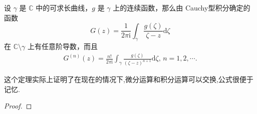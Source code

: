 \documentclass[../../main.tex]{subfiles}%
\begin{document}
\begin{theorem}\label{theorem:定理3.4.2}
设 \( \gamma \) 是 \( \mathbb{C} \) 中的可求长曲线，\( g \) 是 \( \gamma \) 上的连续函数，那么由 Cauchy型积分确定的函数
\[
G(z) = \frac{1}{2\pi \mathrm{i}} \int_{\gamma} \frac{g(\zeta)}{\zeta - z} \mathrm{d}\zeta
\]
在 \( \mathbb{C} \setminus \gamma \) 上有任意阶导数，而且
\begin{align}
G^{(n)}(z) = \frac{n!}{2\pi \mathrm{i}} \int_{\gamma} \frac{g(\zeta)}{(\zeta - z)^{n + 1}} \mathrm{d}\zeta, \, n = 1, 2, \cdots. \label{equation-----::::::4}
\end{align}
\end{theorem}
\begin{note}
这个定理实际上证明了在现在的情况下,微分运算和积分运算可以交换,公式很便于记忆.
\end{note}
\begin{proof}


\end{proof}
\end{document}
